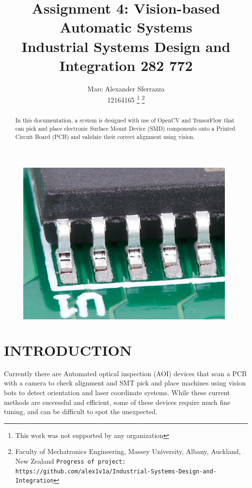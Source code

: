 \documentclass[a4paper, 10pt]{IEEEconf}
\title{\LARGE \bf Assignment 4: Vision-based Automatic Systems\\Industrial Systems Design and Integration 282 772}
\author{Marc Alexander Sferrazza \\ 12164165
\thanks{This work was not supported by any organization}
\thanks{Faculty of Mechatronics Engineering, Massey University, Albany, Auckland, New Zealand
        {\tt\small Progress of project: https://github.com/alex1v1a/Industrial-Systems-Design-and-Integration} } }
\begin{document}
\maketitle
\begin{figure}[H]
  \begin{center}
  \includegraphics[width=110mm]{images/match}
  \label{fig:kinetic}
  \end{center}
\end{figure}
\thispagestyle{empty}
\pagestyle{plain}



\begin{abstract}
  \begin{center}
	In this documentation, a system is designed with use of OpenCV and TensorFlow that can pick and place electronic Surface Mount Device (SMD) components onto a Printed Circuit Board (PCB) and validate their correct alignment using vision.
  \end{center}
\end{abstract}


\clearpage
\tableofcontents
\listoffigures

\clearpage
\setcounter{page}{1}
\onecolumn

\section{INTRODUCTION}
Currently there are Automated optical inspection (AOI) devices that scan a PCB with a camera to check alignment and SMT pick and place machines using vision bots to detect orientation and laser coordinate systems. While these current methods are successful and efficient, some of these devices require much fine tuning, and can be difficult to spot the unexpected.
\end{document}
